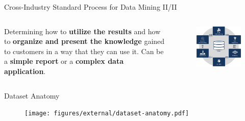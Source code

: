 \documentclass[main.tex]{subfiles}
\begin{document}
\begin{frame}{Cross-Industry Standard Process for Data Mining II/II}
\begin{columns}
\begin{column}{.6\textwidth}
\begin{justify}
                    Determining how to\textbf{ utilize the results} and how to \textbf{organize and present the knowledge} gained to customers in a way that they can use it. Can be a \textbf{simple report} or a \textbf{complex data application}.
                \end{justify}
            \end{column}
            \begin{column}{.4\textwidth}
                \begin{figure}
                    \label{fig:crisp-2}
                    \includegraphics[width=.9\textwidth]{figures/external/crisp.png}
                \end{figure}
            \end{column}
        \end{columns}
    \end{frame}
    
    \begin{frame}{Dataset Anatomy}
        \begin{figure}
            \label{fig:dataset-anatomy}
            \texttt{[image: figures/external/dataset-anatomy.pdf]}
        \end{figure}
    \end{frame}
\end{document}
